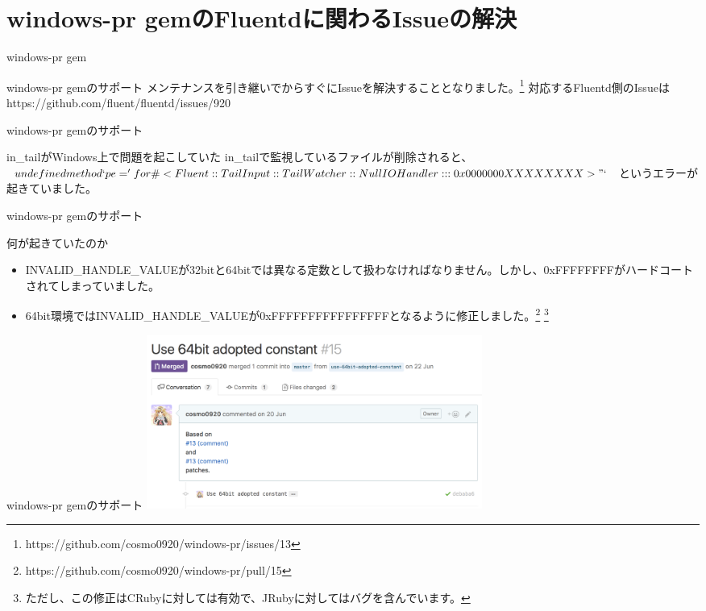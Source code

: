 \documentclass[12pt, unicode]{beamer}
\begin{document}
\section[]{windows-pr gemのFluentdに関わるIssueの解決}
\begin{frame}{windows-pr gem}
  \begin{block}{windows-pr gemのサポート}
メンテナンスを引き継いでからすぐにIssueを解決することとなりました。\footnote[frame]{https://github.com/cosmo0920/windows-pr/issues/13}\newline
対応するFluentd側のIssueは https://github.com/fluent/fluentd/issues/920
  \end{block}
\end{frame}

\begin{frame}{windows-pr gemのサポート}
  \begin{block}{in\_tailがWindows上で問題を起こしていた}
    in\_tailで監視しているファイルが削除されると、\newline
    $undefined method `pe=' for \#<Fluent::TailInput::TailWatcher::NullIOHandler:::0x0000000XXXXXXXX>"`$
    というエラーが起きていました。
  \end{block}
\end{frame}

\begin{frame}{windows-pr gemのサポート}
  \begin{block}{何が起きていたのか}
    \begin{itemize}
    \item INVALID\_HANDLE\_VALUEが32bitと64bitでは異なる定数として扱わなければなりません。しかし、0xFFFFFFFFがハードコートされてしまっていました。
    \item 64bit環境ではINVALID\_HANDLE\_VALUEが0xFFFFFFFFFFFFFFFFとなるように修正しました。\footnote[frame]{https://github.com/cosmo0920/windows-pr/pull/15} \footnote[frame]{ただし、この修正はCRubyに対しては有効で、JRubyに対してはバグを含んでいます。}
    \end{itemize}
  \end{block}
\end{frame}

\begin{frame}{windows-pr gemのサポート}
  \includegraphics[clip,width=11cm]{images/fixes-invalid-constant-in-64bit-windows-pr.png}
\end{frame}
\end{document}
